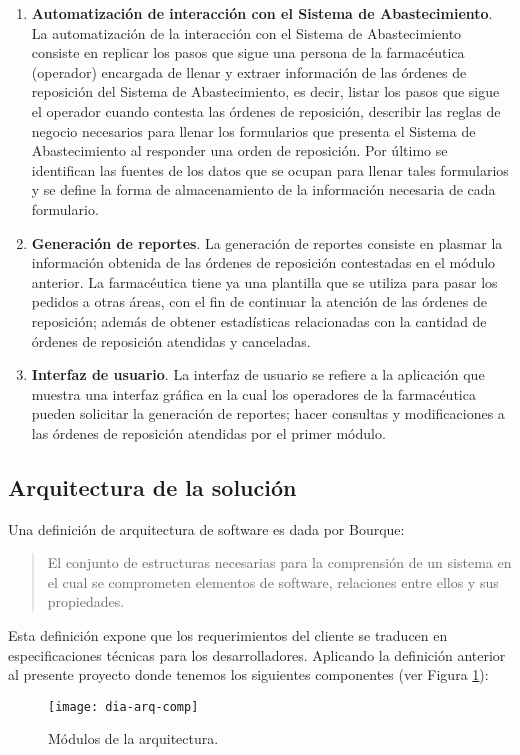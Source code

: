 \begin{enumerate}
\item \textbf{Automatización de interacción con el Sistema de Abastecimiento}. La automatización de la interacción con el Sistema de Abastecimiento consiste en replicar los pasos que sigue una persona de la farmacéutica (operador) encargada de llenar y extraer información de las órdenes de reposición del Sistema de Abastecimiento, es decir, listar los pasos que sigue el operador cuando contesta las órdenes de reposición, describir las reglas de negocio necesarios para llenar los formularios que presenta el Sistema de Abastecimiento al responder una orden de reposición. Por último se identifican las fuentes de los datos que se ocupan para llenar tales formularios y se define la forma de almacenamiento de la información necesaria de cada formulario.
\item \textbf{Generación de reportes}. La generación de reportes consiste en plasmar la información obtenida de las órdenes de reposición contestadas en el módulo anterior. La farmacéutica tiene ya una plantilla que se utiliza para pasar los pedidos a otras áreas, con el fin de continuar la atención de las órdenes de reposición; además de obtener estadísticas relacionadas con la cantidad de órdenes de reposición atendidas y canceladas.
\item \textbf{Interfaz de usuario}. La interfaz de usuario se refiere a la aplicación que muestra una interfaz gráfica en la cual los operadores de la farmacéutica pueden solicitar la generación de reportes; hacer consultas y modificaciones a las órdenes de reposición atendidas por el primer módulo.
\end{enumerate}

\subsection{Arquitectura de la solución}
Una definición de arquitectura de software es dada por Bourque\cite{SWEBOOK}:
\begin{quote}
El conjunto de estructuras necesarias para la comprensión de un sistema en el cual se comprometen elementos de software, relaciones entre ellos y sus propiedades.
\end{quote}
Esta definición expone que los requerimientos del cliente se traducen en especificaciones técnicas para los desarrolladores. Aplicando la definición anterior al presente proyecto donde tenemos los siguientes componentes (ver Figura \ref{fig:dia-arq-comp}):
\begin{figure}[h]
\centering
\texttt{[image: dia-arq-comp]} 
\caption{Módulos de la arquitectura.}
\label{fig:dia-arq-comp}
\end{figure}


